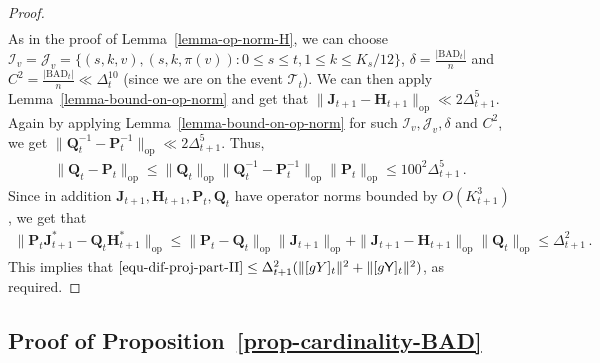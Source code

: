 \documentclass[11pt]{article}
\numberwithin{equation}{section}
\begin{document}
\begin{proof}
\begin{align*}
\end{align*}
As in the proof of Lemma~\ref{lemma-op-norm-H}, we can choose $\mathcal{I}_v = \mathcal{J}_v = \{ (s,k,v),(s,k,\pi(v)) : 0 \leq s \leq t, 1 \leq k \leq K_s/12 \}$, $\delta= \frac{ |\mathrm{BAD}_t| }{ n } $ and $C^2 = \frac{ |\mathrm{BAD}_t| }{ n } \ll \Delta_t^{10}$ (since we are on the event $\mathcal{T}_t$). We can then apply Lemma~\ref{lemma-bound-on-op-norm} and get that $\|\mathbf{J}_{t+1} - \mathbf{H}_{t+1}\|_{\mathrm{op}} \ll 2 \Delta_{t+1}^{5}$. Again by applying Lemma~\ref{lemma-bound-on-op-norm} for such $\mathcal{I}_v , \mathcal{J}_v, \delta$ and $C^2$, we get  $\|\mathbf{Q}_t^{-1} - \mathbf{P}_t^{-1}\|_{\mathrm{op}} \ll 2\Delta_{t+1}^{5}$. Thus,
\begin{align*}
    \| \mathbf{Q}_t - \mathbf{P}_t \|_{\mathrm{op}} \leq \| \mathbf{Q}_t \|_{\mathrm{op}} \| \mathbf{Q}_t^{-1} - \mathbf{P}_t^{-1} \|_{\mathrm{op}} \| \mathbf{P}_t \|_{\mathrm{op}} \leq 100^2  \Delta_{t+1}^{5}\,.
\end{align*}
Since in addition $\mathbf{J}_{t+1}, \mathbf{H}_{t+1}, \mathbf{P}_t, \mathbf{Q}_t$ have operator norms bounded by $O(K^3_{t+1})$, we get that
\begin{align*}
    \| \mathbf{P}_t \mathbf{J}_{t+1}^{*} - \mathbf{Q}_t \mathbf{H}_{t+1}^{*} \|_{\mathrm{op}} \leq \| \mathbf{P}_t - \mathbf{Q}_t \|_{\mathrm{op}} \| \mathbf{J}_{t+1} \|_{\mathrm{op}} + \| \mathbf{J}_{t+1} - \mathbf{H}_{t+1} \|_{\mathrm{op}} \| \mathbf{Q}_t \|_{\mathrm{op}} \leq \Delta_{t+1}^2 \,.
\end{align*}
This implies that $\eqref{equ-dif-proj-part-II} \leq \Delta_{t+1}^2 (\| [g Y]_t \|^2 + \| [g\mathsf{Y}]_t \|^2)$, as required.
\end{proof}








\subsection{Proof of Proposition~\ref{prop-cardinality-BAD}} {\label{sec:actual-proof}}
\end{document}
